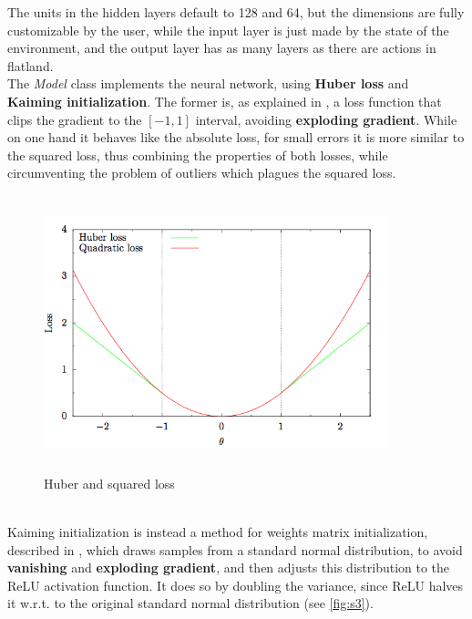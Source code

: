 \noindent 
The units in the hidden layers default to 128 and 64, but the dimensions are fully customizable by the user, while the input layer is just made by the state of the environment, and the output layer has as many layers as there are actions in flatland. \\ The \textit{Model} class implements the neural network, using \textbf{Huber loss} and \textbf{Kaiming initialization}. The former is, as explained in \cite{huber}, a loss function that clips the gradient to the $[-1,1]$ interval, avoiding \textbf{exploding gradient}. While on one hand it behaves like the absolute loss, for small errors it is more similar to the squared loss, thus combining the properties of both losses, while circumventing the problem of outliers which plagues the squared loss.\\
\begin{figure}[H] 
\includegraphics[height=80mm, width=100mm, scale=0.5]{chapters/huber.png}
\centering
\caption{Huber and squared loss}
\label{fig:s2} 
\end{figure}
\noindent
 \\ Kaiming initialization is instead a method for weights matrix initialization, described in \cite{kaiming}, which draws samples from a standard normal distribution, to avoid \textbf{vanishing} and \textbf{exploding gradient}, and then adjusts this distribution to the ReLU activation function. It does so by doubling the variance, since ReLU halves it w.r.t. to the original standard normal distribution (see \ref{fig:s3}).
 
